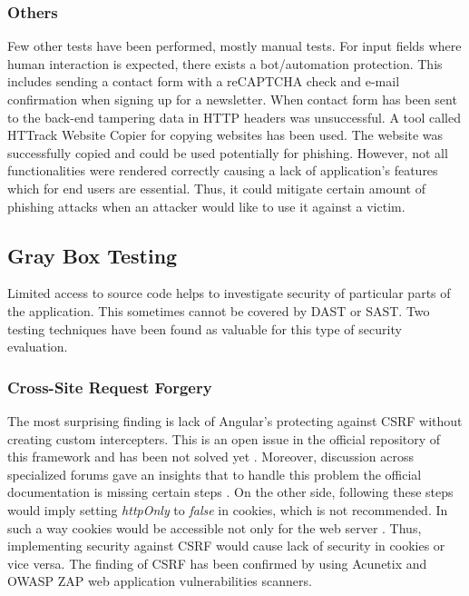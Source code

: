 \documentclass{article} %
\begin{document}
\subsubsection{Others}
Few other tests have been performed, mostly manual tests. For input fields where human interaction is expected, there exists a bot/automation protection. This includes sending a contact form with a reCAPTCHA check and e-mail confirmation when signing up for a newsletter. When contact form has been sent to the back-end tampering data in HTTP headers was unsuccessful. A tool called HTTrack Website Copier for copying websites has been used. The website was successfully copied and could be used potentially for phishing. However, not all functionalities were rendered correctly causing a lack of application's features which for end users are essential. Thus, it could mitigate certain amount of phishing attacks when an attacker would like to use it against a victim.
\subsection{Gray Box Testing}
Limited access to source code helps to investigate security of particular parts of the application. This sometimes cannot be covered by DAST or SAST. Two testing techniques have been found as valuable for this type of security evaluation.
\subsubsection{Cross-Site Request Forgery}
The most surprising finding is lack of Angular's protecting against CSRF without creating custom intercepters. This is an open issue in the official repository of this framework and has been not solved yet \cite{bib:angular_csrf_issue}. Moreover, discussion across specialized forums gave an insights that to handle this problem the official documentation is missing certain steps \cite{bib:angular_csrf_stackoverflow}. On the other side, following these steps would imply setting \textit{httpOnly} to \textit{false} in cookies, which is not recommended. In such a way cookies would be accessible not only for the web server \cite{bib:csurf}. Thus, implementing security against CSRF would cause lack of security in cookies or vice versa. The finding of CSRF has been confirmed by using Acunetix and OWASP ZAP web application vulnerabilities scanners.
\end{document}
